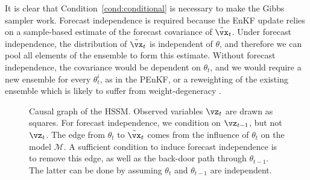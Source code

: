 \documentclass[12pt]{article}
\begin{document}
It is clear that Condition~\ref{cond:conditional} is necessary to make the Gibbs
sampler work.  Forecast independence is required because the EnKF update relies
on a sample-based estimate of the forecast covariance of $\tilde\vx_t$. Under
forecast independence, the distribution of $\tilde\vx_t$ is independent of
$\theta$, and therefore we can pool all elements of the ensemble to form this
estimate. Without forecast independence, the covariance would be dependent on
$\theta_t$, and we would require a new ensemble for every $\theta_t^i$, as in
the PEnKF, or a reweighting of the existing ensemble which is likely to suffer
from weight-degeneracy \cite{katzfuss2020}.

\begin{figure}[ht]
\centering
{}
\caption{Causal graph of the HSSM. Observed
variables $\vz_t$ are drawn as squares. For forecast independence, we condition
on $\vz_{t-1}$, but not $\vz_t$. The edge from $\theta_t$
to $\tilde\vx_t$ comes from the influence of $\theta_t$ on the model
$\mathcal M$. A sufficient condition to induce forecast independence is to
remove this edge, as well as the back-door path through $\theta_{t-1}$.
The latter can be done by assuming $\theta_t$ and $\theta_{t-1}$ are independent.}
\label{fig:hssm-dag}
\end{figure}
\end{document}
